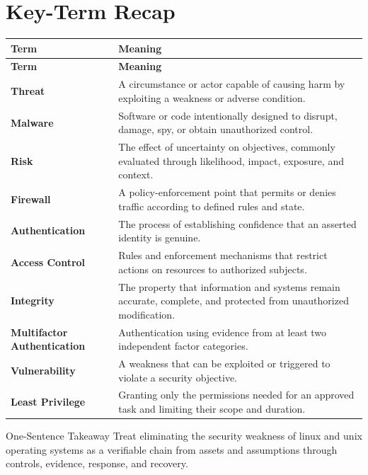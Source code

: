 \documentclass[11pt,letterpaper]{article}
\begin{document}
\section*{Key-Term Recap}
\begin{longtable}{>{\raggedright\arraybackslash}p{}>{\raggedright\arraybackslash}p{}}
\toprule\rowcolor{Navy}\color{white}\textbf{Term} & \color{white}\textbf{Meaning}\\\midrule
\endfirsthead
\toprule\rowcolor{Navy}\color{white}\textbf{Term} & \color{white}\textbf{Meaning}\\\midrule
\endhead
\textbf{Threat} & A circumstance or actor capable of causing harm by exploiting a weakness or adverse condition. \\\midrule
\textbf{Malware} & Software or code intentionally designed to disrupt, damage, spy, or obtain unauthorized control. \\\midrule
\textbf{Risk} & The effect of uncertainty on objectives, commonly evaluated through likelihood, impact, exposure, and context. \\\midrule
\textbf{Firewall} & A policy-enforcement point that permits or denies traffic according to defined rules and state. \\\midrule
\textbf{Authentication} & The process of establishing confidence that an asserted identity is genuine. \\\midrule
\textbf{Access Control} & Rules and enforcement mechanisms that restrict actions on resources to authorized subjects. \\\midrule
\textbf{Integrity} & The property that information and systems remain accurate, complete, and protected from unauthorized modification. \\\midrule
\textbf{Multifactor Authentication} & Authentication using evidence from at least two independent factor categories. \\\midrule
\textbf{Vulnerability} & A weakness that can be exploited or triggered to violate a security objective. \\\midrule
\textbf{Least Privilege} & Granting only the permissions needed for an approved task and limiting their scope and duration. \\\midrule
\bottomrule
\end{longtable}
\begin{CornellExamBox}{One-Sentence Takeaway}
Treat eliminating the security weakness of linux and unix operating systems as a verifiable chain from assets and assumptions through controls, evidence, response, and recovery.
\end{CornellExamBox}
\end{document}
